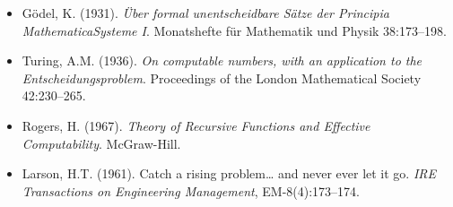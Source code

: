 \documentclass[12pt,a4paper]{article}
\begin{document}
\begin{itemize}
Deutschen Mathematiker-Vereinigung 1:75--78.
 \item G\"odel, K. (1931). \emph{\"Uber formal unentscheidbare S\"atze der Principia MathematicaSysteme I}. Monatshefte f\"ur Mathematik und Physik 38:173--198.
 \item Turing, A.M. (1936). \emph{On computable numbers, with an application to the Entscheidungsproblem}.
Proceedings of the London Mathematical Society 42:230--265.
 \item Rogers, H. (1967). \emph{Theory of Recursive Functions and Effective Computability}. McGraw-Hill.
 \item Larson, H.T. (1961). Catch a rising problem\ldots{} and never ever let it go. \emph{IRE Transactions on Engineering Management}, EM-8(4):173--174.
\end{itemize}
\end{document}

